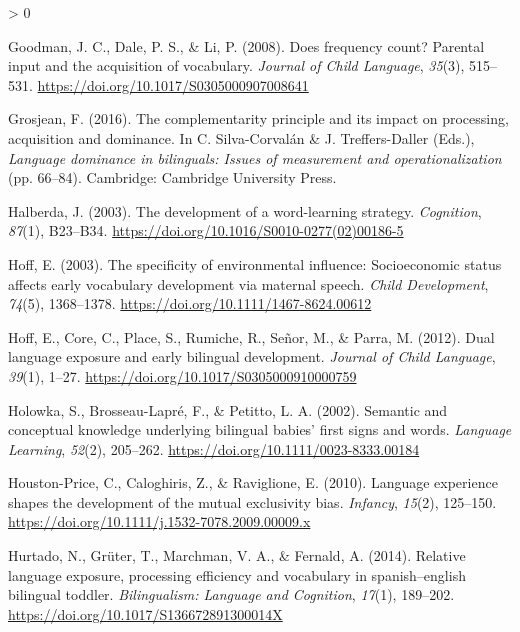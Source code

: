 \documentclass[
  english,
  ,man,floatsintext]{apa6}
\newlength{\cslhangindent}
\newenvironment{CSLReferences}[2] %
 {%
  \setlength{\parindent}{0pt}
  \ifodd #1 \everypar{\setlength{\hangindent}{\cslhangindent}}\ignorespaces\fi
  \ifnum #2 > 0
  \setlength{\parskip}{#2\baselineskip}
  \fi
 }%
 {}
\begin{document}
\begin{CSLReferences}{1}{0}
\leavevmode\hypertarget{ref-Goodman_etal_2008}{}%
Goodman, J. C., Dale, P. S., \& Li, P. (2008). Does frequency count? Parental input and the acquisition of vocabulary. \emph{Journal of Child Language}, \emph{35}(3), 515--531. \url{https://doi.org/10.1017/S0305000907008641}

\leavevmode\hypertarget{ref-Grosjean_2016}{}%
Grosjean, F. (2016). The complementarity principle and its impact on processing, acquisition and dominance. In C. Silva-Corvalán \& J. Treffers-Daller (Eds.), \emph{Language dominance in bilinguals: Issues of measurement and operationalization} (pp. 66--84). Cambridge: Cambridge University Press.

\leavevmode\hypertarget{ref-Halberda_2003}{}%
Halberda, J. (2003). The development of a word-learning strategy. \emph{Cognition}, \emph{87}(1), B23--B34. \url{https://doi.org/10.1016/S0010-0277(02)00186-5}

\leavevmode\hypertarget{ref-Hoff_2003}{}%
Hoff, E. (2003). The specificity of environmental influence: Socioeconomic status affects early vocabulary development via maternal speech. \emph{Child Development}, \emph{74}(5), 1368--1378. \url{https://doi.org/10.1111/1467-8624.00612}

\leavevmode\hypertarget{ref-Hoff_etal_2012}{}%
Hoff, E., Core, C., Place, S., Rumiche, R., Señor, M., \& Parra, M. (2012). Dual language exposure and early bilingual development. \emph{Journal of Child Language}, \emph{39}(1), 1--27. \url{https://doi.org/10.1017/S0305000910000759}

\leavevmode\hypertarget{ref-Holowka_etal_2002}{}%
Holowka, S., Brosseau-Lapré, F., \& Petitto, L. A. (2002). Semantic and conceptual knowledge underlying bilingual babies' first signs and words. \emph{Language Learning}, \emph{52}(2), 205--262. \url{https://doi.org/10.1111/0023-8333.00184}

\leavevmode\hypertarget{ref-Houston-Price_etal_2010}{}%
Houston-Price, C., Caloghiris, Z., \& Raviglione, E. (2010). Language experience shapes the development of the mutual exclusivity bias. \emph{Infancy}, \emph{15}(2), 125--150. \url{https://doi.org/10.1111/j.1532-7078.2009.00009.x}

\leavevmode\hypertarget{ref-Hurtado_etal_2014}{}%
Hurtado, N., Grüter, T., Marchman, V. A., \& Fernald, A. (2014). Relative language exposure, processing efficiency and vocabulary in spanish--english bilingual toddler. \emph{Bilingualism: Language and Cognition}, \emph{17}(1), 189--202. \url{https://doi.org/10.1017/S136672891300014X}


\end{CSLReferences}
\end{document}
